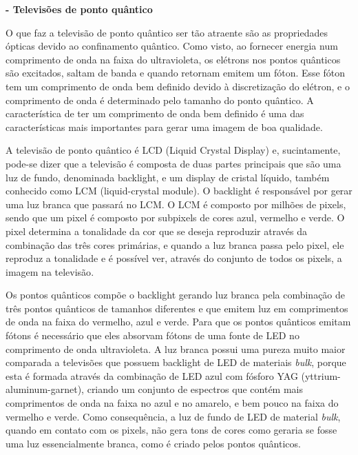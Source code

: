 	\par \textbf{- Televisões de ponto quântico}

		\par O que faz a televisão de ponto quântico ser tão atraente são as propriedades ópticas devido ao confinamento quântico. Como visto, ao fornecer energia num comprimento de onda na faixa do ultravioleta, os elétrons nos pontos quânticos são excitados, saltam de banda e quando retornam emitem um fóton. Esse fóton tem um comprimento de onda bem definido devido à discretização do elétron, e o comprimento de onda é determinado pelo tamanho do ponto quântico\cite{bulk2}. A característica de ter um comprimento de onda bem definido é uma das características mais importantes para gerar uma imagem de boa qualidade.
		
		A televisão de ponto quântico é LCD (Liquid Crystal Display) e, sucintamente, pode-se dizer que a televisão é composta de duas partes principais que são uma luz de fundo, denominada backlight, e um display de cristal líquido, também conhecido como LCM (liquid-crystal module)\cite{sintese10}. O backlight é responsável por gerar uma luz branca que passará no LCM. O LCM é composto por milhões de pixels, sendo que um pixel é composto por subpixels de cores azul, vermelho e verde\cite{sintese10}. O pixel determina a tonalidade da cor que se deseja reproduzir através da combinação das três cores primárias, e quando a luz branca passa pelo pixel, ele reproduz a tonalidade e é possível ver, através do conjunto de todos os pixels, a imagem na televisão\cite{sintese10}.

		Os pontos quânticos compõe o backlight gerando luz branca pela combinação de três pontos quânticos de tamanhos diferentes e que emitem luz em comprimentos de onda na faixa do vermelho, azul e verde\cite{sintese11}. Para que os pontos quânticos emitam fótons é necessário que eles absorvam fótons de uma fonte de LED no comprimento de onda ultravioleta. A luz branca possui uma pureza muito maior comparada a televisões que possuem backlight de LED de materiais \textit{bulk}, porque esta é formada através da combinação de LED azul com fósforo YAG (yttrium-aluminum-garnet), criando um conjunto de espectros que contém mais comprimentos de onda na faixa no azul e no amarelo, e bem pouco na faixa do vermelho e verde\cite{sintese10}. Como consequência, a luz de fundo de LED de material \textit{bulk}, quando em contato com os pixels, não gera tons de cores como geraria se fosse uma luz essencialmente branca, como é criado pelos pontos quânticos.

